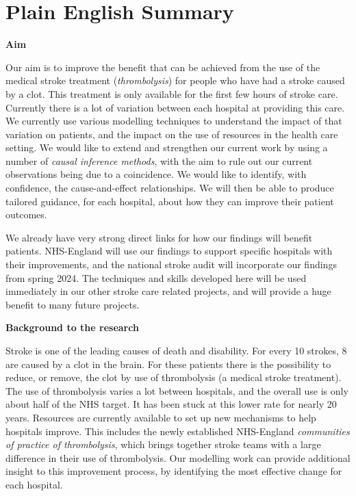 \section{Plain English Summary}

\textbf{Aim}

Our aim is to improve the benefit that can be achieved from the use of the medical stroke treatment (\textit{thrombolysis}) for people who have had a stroke caused by a clot. This treatment is only available for the first few hours of stroke care. Currently there is a lot of variation between each hospital at providing this care. We currently use various modelling techniques to understand the impact of that variation on patients, and the impact on the use of resources in the health care setting. We would like to extend and strengthen our current work by using a number of \textit{causal inference methods}, with the aim to rule out our current observations being due to a coincidence. We would like to identify, with confidence, the cause-and-effect relationships. We will then be able to produce tailored guidance, for each hospital, about how they can improve their patient outcomes. 

We already have very strong direct links for how our findings will benefit patients. NHS-England will use our findings to support specific hospitals with their improvements, and the national stroke audit will incorporate our findings from spring 2024. The techniques and skills developed here will be used immediately in our other stroke care related projects, and will provide a huge benefit to many future projects. 

\textbf{Background to the research}

Stroke is one of the leading causes of death and disability. For every 10 strokes, 8 are caused by a clot in the brain. For these patients there is the possibility to reduce, or remove, the clot by use of thrombolysis (a medical stroke treatment). The use of thrombolysis varies a lot between hospitals, and the overall use is only about half of the NHS target. It has been stuck at this lower rate for nearly 20 years. Resources are currently available to set up new mechanisms to help hospitals improve. This includes the newly established NHS-England \textit{communities of practice of thrombolysis}, which brings together stroke teams with a large difference in their use of thrombolysis. Our modelling work can provide additional insight to this improvement process, by identifying the most effective change for each hospital. 

